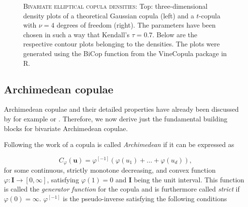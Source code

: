 \begin{figure}[!ht]
{	}
	\hfill
	\caption[\textsc{Bivariate elliptical copula densities:} A comparison between Gaussian and $t$-copulae]{\textsc{Bivariate elliptical copula densities:} Top: three-dimensional density plots of a theoretical Gaussian copula (left) and a $t$-copula with $\nu = 4$ degrees of freedom (right). The parameters have been chosen in such a way that Kendall's $\tau = 0.7$. Below are the respective contour plots belonging to the densities. The plots were generated using the BiCop function from the VineCopula package in R.}
	\label{dens-cont-normal-t}
\end{figure}

\subsection{Archimedean copulae}

Archimedean copulae and their detailed properties have already been discussed by for example \citet{nelsen2007introduction} or \citet{mcneil2009multivariate}. Therefore, we now derive just the fundamental building blocks for bivariate Archimedean copulae.

Following the work of \citet{genest1993statistical} a copula is called \textit{Archimedean} if it can be expressed as

\begin{equation}
	C_{\varphi}\left( \mathbf{u}\right) = \varphi ^{[-1]}\left( \varphi \left( u_1\right) +\dots +\varphi \left( u_d\right) \right),
\end{equation}
%
for some continuous, strictly monotone decreasing, and convex function $\varphi : \mathbf{I} \rightarrow \left[ 0,\infty \right] $, satisfying $\varphi \left( 1 \right)=0$ and $\mathbf{I}$ being the unit interval. This function is called the \textit{generator function} for the copula and is furthermore called \textit{strict} if $\varphi \left( 0 \right) = \infty$. $\varphi ^{[-1]}$ is the pseudo-inverse satisfying the following conditions

